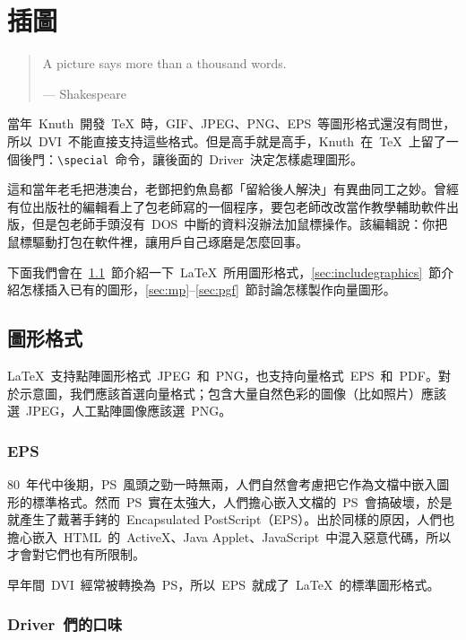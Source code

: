 \chapter{插圖}
\label{sec:graphics}

\begin{quotation}
A picture says more than a thousand words.
\begin{flushright}
--- Shakespeare
\end{flushright}
\end{quotation}

當年~Knuth~開發~\TeX~時，GIF、JPEG、PNG、EPS~等圖形格式還沒有問世，所以~DVI~不能直接支持這些格式。但是高手就是高手，Knuth~在~\TeX~上留了一個後門：\verb|\special|~命令，讓後面的~Driver~決定怎樣處理圖形。

這和當年老毛把港澳台，老鄧把釣魚島都「留給後人解決」有異曲同工之妙。曾經有位出版社的編輯看上了包老師寫的一個程序，要包老師改改當作教學輔助軟件出版，但是包老師手頭沒有~DOS~中斷的資料沒辦法加鼠標操作。該編輯說：你把鼠標驅動打包在軟件裡，讓用戶自己琢磨是怎麼回事。

下面我們會在~\ref{sec:graphics_format}~節介紹一下~\LaTeX~所用圖形格式，\ref{sec:includegraphics}~節介紹怎樣插入已有的圖形，\ref{sec:mp}--\ref{sec:pgf}~節討論怎樣製作向量圖形。

\section{圖形格式}
\label{sec:graphics_format}

\LaTeX~支持點陣圖形格式~JPEG~和~PNG，也支持向量格式~EPS~和~PDF。對於示意圖，我們應該首選向量格式；包含大量自然色彩的圖像（比如照片）應該選~JPEG，人工點陣圖像應該選~PNG。

\subsection{EPS}
80~年代中後期，PS~風頭之勁一時無兩，人們自然會考慮把它作為文檔中嵌入圖形的標準格式。然而~PS~實在太強大，人們擔心嵌入文檔的~PS~會搞破壞，於是就產生了戴著手銬的~Encapsulated PostScript（EPS）。出於同樣的原因，人們也擔心嵌入~HTML~的~ActiveX、Java Applet、JavaScript~中混入惡意代碼，所以才會對它們也有所限制。

早年間~DVI~經常被轉換為~PS，所以~EPS~就成了~\LaTeX~的標準圖形格式。

\subsection{Driver~們的口味}

